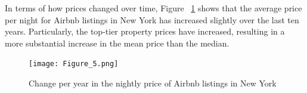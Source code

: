 In terms of how prices changed over time, Figure
~\ref{fig:prices-change-by-years} shows that the average price per night for
Airbnb listings in New York has increased slightly over the
last ten years. Particularly, the top-tier property prices have increased,
resulting in a more substantial increase in the mean price than the median.

\begin{figure}[H] \centering
    \texttt{[image: Figure\_5.png]}
    \caption{Change per year in the nightly price of Airbnb listings in New York}
    \label{fig:prices-change-by-years}
\end{figure}

